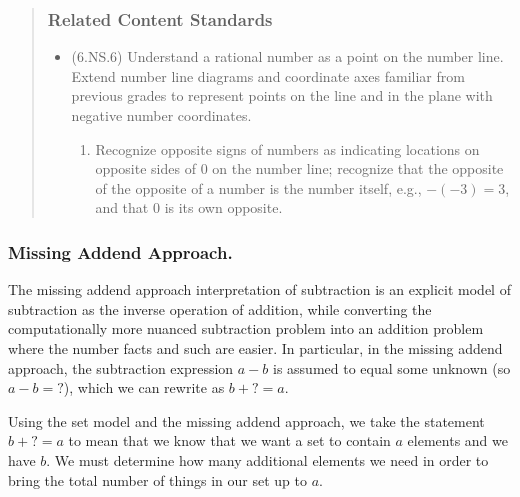 \documentclass[
]{book}
\providecommand{\tightlist}{%
  \setlength{\itemsep}{0pt}\setlength{\parskip}{0pt}}
\theoremstyle{definition}
\theoremstyle{definition}
\theoremstyle{definition}
\theoremstyle{remark}
\begin{document}
\begin{quote}
\hypertarget{related-content-standards-7}{%
\subsubsection*{Related Content Standards}\label{related-content-standards-7}}

\begin{itemize}
\tightlist
\item
  (6.NS.6) Understand a rational number as a point on the number line. Extend number line diagrams and coordinate axes familiar from previous grades to represent points on the line and in the plane with negative number coordinates.

  \begin{enumerate}
  \def\labelenumi{\alph{enumi}.}
  \tightlist
  \item
    Recognize opposite signs of numbers as indicating locations on opposite sides of \(0\) on the number line; recognize that the opposite of the opposite of a number is the number itself, e.g., \(-(-3) = 3\), and that \(0\) is its own opposite.
  \end{enumerate}
\end{itemize}
\end{quote}

\hypertarget{missing-addend-approach.}{%
\subsubsection*{Missing Addend Approach.}\label{missing-addend-approach.}}

The missing addend approach interpretation of subtraction is an explicit model of subtraction as the inverse operation of addition, while converting the computationally more nuanced subtraction problem into an addition problem where the number facts and such are easier. In particular, in the missing addend approach, the subtraction expression \(a-b\) is assumed to equal some unknown (so \(a-b=?\)), which we can rewrite as \(b+?=a\).

Using the set model and the missing addend approach, we take the statement \(b+?=a\) to mean that we know that we want a set to contain \(a\) elements and we have \(b\). We must determine how many additional elements we need in order to bring the total number of things in our set up to \(a\).
\end{document}
